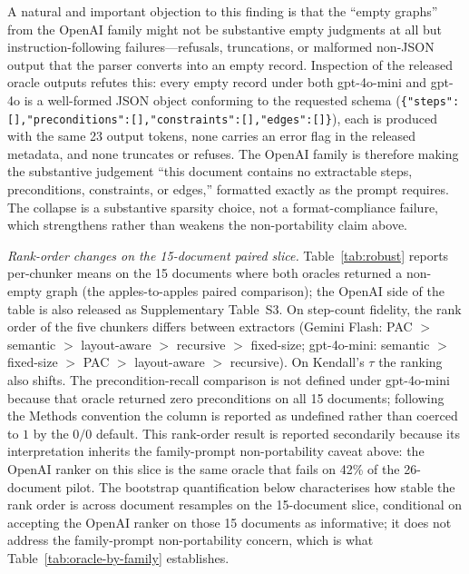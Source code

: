 \documentclass[make,article,submit,oneauthor,pdftex]{Definitions/mdpi}
\begin{document}
A natural and important objection to this finding is that the
``empty graphs'' from the OpenAI family might not be substantive
empty judgments at all but instruction-following failures---refusals,
truncations, or malformed non-JSON output that the parser converts
into an empty record. Inspection of the released oracle outputs
refutes this: every empty record under both gpt-4o-mini and gpt-4o
is a well-formed JSON object conforming to the requested schema
(\texttt{\{"steps":[],"preconditions":[],"constraints":[],"edges":[]\}}),
each is produced with the same 23 output tokens, none carries an
error flag in the released metadata, and none truncates or refuses.
The OpenAI family is therefore making the substantive judgement
``this document contains no extractable steps, preconditions,
constraints, or edges,'' formatted exactly as the prompt requires.
The collapse is a substantive sparsity choice, not a format-compliance
failure, which strengthens rather than weakens the
non-portability claim above.

\emph{Rank-order changes on the 15-document paired slice.}
Table~\ref{tab:robust} reports per-chunker means on the 15 documents
where both oracles returned a non-empty graph (the apples-to-apples
paired comparison); the OpenAI side of the table is also released
as Supplementary Table~S3. On step-count fidelity, the rank order
of the five chunkers differs between extractors (Gemini Flash:
PAC $>$ semantic $>$ layout-aware $>$ recursive $>$ fixed-size;
gpt-4o-mini: semantic $>$ fixed-size $>$ PAC $>$ layout-aware $>$
recursive). On Kendall's $\tau$ the ranking also shifts. The
precondition-recall comparison is not defined under gpt-4o-mini
because that oracle returned zero preconditions on all 15
documents; following the Methods convention the column is reported
as undefined rather than coerced to $1$ by the $0/0$ default. This
rank-order result is reported secondarily because its interpretation
inherits the family-prompt non-portability caveat above: the OpenAI
ranker on this slice is the same oracle that fails on 42\% of the
26-document pilot. The bootstrap quantification below characterises
how stable the rank order is across document resamples on the
15-document slice, conditional on accepting the OpenAI ranker on
those 15 documents as informative; it does not address the
family-prompt non-portability concern, which is what
Table~\ref{tab:oracle-by-family} establishes.
\end{document}
